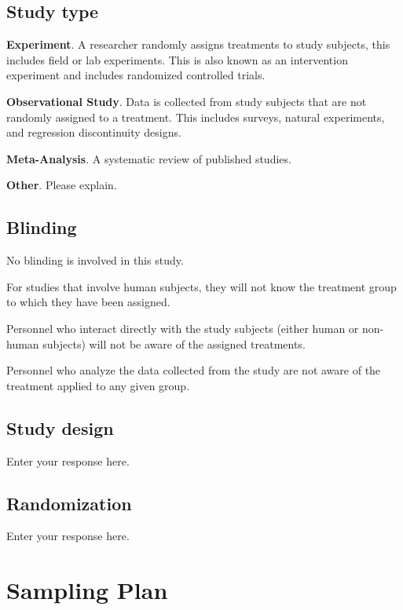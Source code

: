 \documentclass[]{article}
\begin{document}
\subsection{Study type}\label{study-type}

\textbf{Experiment}. A researcher randomly assigns treatments to study
subjects, this includes field or lab experiments. This is also known as
an intervention experiment and includes randomized controlled trials.

\textbf{Observational Study}. Data is collected from study subjects that
are not randomly assigned to a treatment. This includes surveys, natural
experiments, and regression discontinuity designs.

\textbf{Meta-Analysis}. A systematic review of published studies.

\textbf{Other}. Please explain.

\subsection{Blinding}\label{blinding}

No blinding is involved in this study.

For studies that involve human subjects, they will not know the
treatment group to which they have been assigned.

Personnel who interact directly with the study subjects (either human or
non-human subjects) will not be aware of the assigned treatments.

Personnel who analyze the data collected from the study are not aware of
the treatment applied to any given group.

\subsection{Study design}\label{study-design}

Enter your response here.

\subsection{Randomization}\label{randomization}

Enter your response here.

\section{Sampling Plan}\label{sampling-plan}
\end{document}
